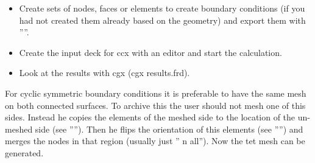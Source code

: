 \documentclass{article}
\begin{document}
\begin{appendix}
\begin{itemize}
\item Create sets of nodes, faces or elements to create boundary conditions (if you had not created them already based on the geometry) and export them with ''''.

\item Create the input deck for ccx with an editor and start the calculation.

\item Look at the results with cgx (cgx results.frd).
\end{itemize}

For cyclic symmetric boundary conditions it is preferable to have the same mesh on both connected surfaces. To archive this the user should not mesh one of this sides. Instead he copies the elements of the meshed side to the location of the un-meshed side (see ''''). Then he flips the orientation of this elements (see '''') and merges the nodes in that region (usually just '' n all''). Now the tet mesh can be generated.


\end{appendix}
\end{document}
